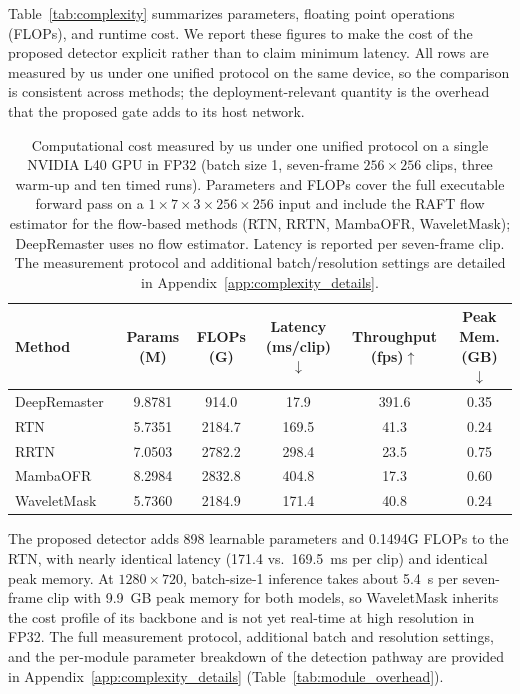 Table~\ref{tab:complexity} summarizes parameters, floating point operations (FLOPs), and runtime cost. We report these figures to make the cost of the proposed detector explicit rather than to claim minimum latency. All rows are measured by us under one unified protocol on the same device, so the comparison is consistent across methods; the deployment-relevant quantity is the overhead that the proposed gate adds to its host network.

\begin{table}[H]
\caption{Computational cost measured by us under one unified protocol on a single NVIDIA L40 GPU in FP32 (batch size 1, seven-frame $256\times256$ clips, three warm-up and ten timed runs). Parameters and FLOPs cover the full executable forward pass on a $1\times7\times3\times256\times256$ input and include the RAFT flow estimator for the flow-based methods (RTN, RRTN, MambaOFR, WaveletMask); DeepRemaster uses no flow estimator. Latency is reported per seven-frame clip. The measurement protocol and additional batch/resolution settings are detailed in Appendix~\ref{app:complexity_details}.\label{tab:complexity}\label{tab:runtime_benchmark}}
\footnotesize
\begin{tabularx}{\textwidth}{lCCCCC}
\toprule
\textbf{Method} & \textbf{Params (M)} & \textbf{FLOPs (G)} & \textbf{Latency (ms/clip)$\downarrow$} & \textbf{Throughput (fps)$\uparrow$} & \textbf{Peak Mem. (GB)$\downarrow$} \\
\midrule
DeepRemaster~\cite{iizuka2019deepremaster}  & 9.8781 & 914.0  & 17.9  & 391.6 & 0.35 \\
RTN~\cite{rtn2022}                          & 5.7351 & 2184.7 & 169.5 & 41.3  & 0.24 \\
RRTN~\cite{rrtn2024}                        & 7.0503 & 2782.2 & 298.4 & 23.5  & 0.75 \\
MambaOFR~\cite{mao2025mambaofr}             & 8.2984 & 2832.8 & 404.8 & 17.3  & 0.60 \\
\midrule
WaveletMask                                 & 5.7360 & 2184.9 & 171.4 & 40.8  & 0.24 \\
\bottomrule
\end{tabularx}
\normalsize
\end{table}

The proposed detector adds 898 learnable parameters and 0.1494G FLOPs to the RTN, with nearly identical latency (171.4 vs.\ 169.5~ms per clip) and identical peak memory. At $1280\times720$, batch-size-1 inference takes about 5.4~s per seven-frame clip with 9.9~GB peak memory for both models, so WaveletMask inherits the cost profile of its backbone and is not yet real-time at high resolution in FP32. The full measurement protocol, additional batch and resolution settings, and the per-module parameter breakdown of the detection pathway are provided in Appendix~\ref{app:complexity_details} (Table~\ref{tab:module_overhead}).
